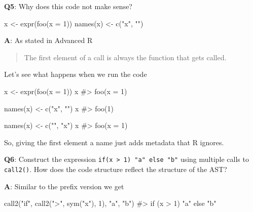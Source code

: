 \documentclass[
]{krantz}
\makeatletter
\newenvironment{Shaded}{\begin{snugshade}}{\end{snugshade}}
\newcommand{\CommentTok}[1]{\textcolor[rgb]{0.56,0.35,0.01}{\textit{#1}}}
\newcommand{\DataTypeTok}[1]{\textcolor[rgb]{0.13,0.29,0.53}{#1}}
\newcommand{\DecValTok}[1]{\textcolor[rgb]{0.00,0.00,0.81}{#1}}
\newcommand{\KeywordTok}[1]{\textcolor[rgb]{0.13,0.29,0.53}{\textbf{#1}}}
\newcommand{\NormalTok}[1]{#1}
\newcommand{\StringTok}[1]{\textcolor[rgb]{0.31,0.60,0.02}{#1}}
\newenvironment{kframe}{%
\medskip{}
\setlength{\fboxsep}{.8em}
 \def\at@end@of@kframe{}%
 \ifinner\ifhmode%
  \def\at@end@of@kframe{\end{minipage}}%
  \begin{minipage}{\columnwidth}%
 \fi\fi%
 \def\FrameCommand##1{\hskip\@totalleftmargin \hskip-\fboxsep
 \colorbox{shadecolor}{##1}\hskip-\fboxsep
     \hskip-\linewidth \hskip-\@totalleftmargin \hskip\columnwidth}%
 \MakeFramed {\advance\hsize-\width
   \@totalleftmargin\z@ \linewidth\hsize
   \@setminipage}}%
 {\par\unskip\endMakeFramed%
 \at@end@of@kframe}
\renewenvironment{Shaded}{\begin{kframe}}{\end{kframe}}
\renewcommand{\KeywordTok} [1]{\textcolor[rgb]{0.00,0.44,0.13}{{#1}}}
\renewcommand{\DataTypeTok}[1]{\textcolor[rgb]{0.56,0.13,0.00}{{#1}}}
\renewcommand{\DecValTok}  [1]{\textcolor[rgb]{0.25,0.63,0.44}{{#1}}}
\renewcommand{\StringTok}  [1]{\textcolor[rgb]{0.25,0.44,0.63}{{#1}}}
\renewcommand{\CommentTok} [1]{\textcolor[rgb]{0.38,0.63,0.69}{{#1}}}
\renewcommand{\NormalTok}  [1]{{#1}}
\makeatother
\begin{document}
\textbf{{Q5}}: Why does this code not make sense?

\begin{Shaded}
\begin{Highlighting}[]
\NormalTok{x <-}\StringTok{ }\KeywordTok{expr}\NormalTok{(}\KeywordTok{foo}\NormalTok{(}\DataTypeTok{x =} \DecValTok{1}\NormalTok{))}
\KeywordTok{names}\NormalTok{(x) <-}\StringTok{ }\KeywordTok{c}\NormalTok{(}\StringTok{"x"}\NormalTok{, }\StringTok{""}\NormalTok{)}
\end{Highlighting}
\end{Shaded}

\textbf{{A}}: As stated in Advanced R

\begin{quote}
The first element of a call is always the function that gets called.
\end{quote}

Let's see what happens when we run the code

\begin{Shaded}
\begin{Highlighting}[]
\NormalTok{x <-}\StringTok{ }\KeywordTok{expr}\NormalTok{(}\KeywordTok{foo}\NormalTok{(}\DataTypeTok{x =} \DecValTok{1}\NormalTok{))}
\NormalTok{x}
\CommentTok{#> foo(x = 1)}

\KeywordTok{names}\NormalTok{(x) <-}\StringTok{ }\KeywordTok{c}\NormalTok{(}\StringTok{"x"}\NormalTok{, }\StringTok{""}\NormalTok{)}
\NormalTok{x}
\CommentTok{#> foo(1)}

\KeywordTok{names}\NormalTok{(x) <-}\StringTok{ }\KeywordTok{c}\NormalTok{(}\StringTok{""}\NormalTok{, }\StringTok{"x"}\NormalTok{)}
\NormalTok{x}
\CommentTok{#> foo(x = 1)}
\end{Highlighting}
\end{Shaded}

So, giving the first element a name just adds metadata that R ignores.

\textbf{{Q6}}: Construct the expression \texttt{if(x\ \textgreater{}\ 1)\ "a"\ else\ "b"} using multiple calls to \texttt{call2()}. How does the code structure reflect the structure of the AST?

\textbf{{A}}: Similar to the prefix version we get

\begin{Shaded}
\begin{Highlighting}[]
\KeywordTok{call2}\NormalTok{(}\StringTok{"if"}\NormalTok{, }\KeywordTok{call2}\NormalTok{(}\StringTok{">"}\NormalTok{, }\KeywordTok{sym}\NormalTok{(}\StringTok{"x"}\NormalTok{), }\DecValTok{1}\NormalTok{), }\StringTok{"a"}\NormalTok{, }\StringTok{"b"}\NormalTok{)}
\CommentTok{#> if (x > 1) "a" else "b"}
\end{Highlighting}
\end{Shaded}
\end{document}
